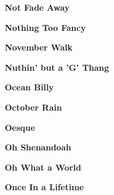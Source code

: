 \vspace{10pt} 
\begin{center}\textbf{Not Fade Away}\end{center}
\newline
\vspace{10pt} 
\begin{center}\textbf{Nothing Too Fancy}\end{center}
\newline
\vspace{10pt} 
\begin{center}\textbf{November Walk}\end{center}
\newline
\vspace{10pt} 
\begin{center}\textbf{Nuthin' but a 'G' Thang}\end{center}
\newline
\vspace{10pt} 
\begin{center}\textbf{Ocean Billy}\end{center}
\newline
\vspace{10pt} 
\begin{center}\textbf{October Rain}\end{center}
\newline
\vspace{10pt} 
\begin{center}\textbf{Oesque}\end{center}
\newline
\vspace{10pt} 
\begin{center}\textbf{Oh Shenandoah}\end{center}
\newline
\vspace{10pt} 
\begin{center}\textbf{Oh What a World}\end{center}
\newline
\vspace{10pt} 
\begin{center}\textbf{Once In a Lifetime}\end{center}
